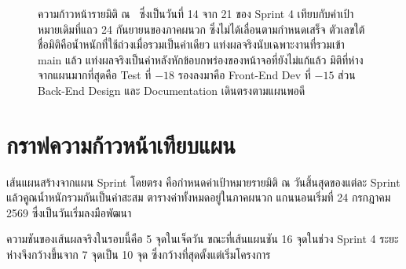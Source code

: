 \begin{figure}[H]
\centering
{}
\vspace{0.6em}
\caption{ความก้าวหน้ารายมิติ ณ \reportdate\ ซึ่งเป็นวันที่ 14 จาก 21 ของ Sprint 4
 เทียบกับค่าเป้าหมายเดิมที่แถว 24 กันยายนของภาคผนวก ซึ่งไม่ได้เลื่อนตามกำหนดเสร็จ
 ตัวเลขใต้ชื่อมิติคือน้ำหนักที่ใช้ถ่วงเมื่อรวมเป็นค่าเดียว
 แท่งผลจริงนับเฉพาะงานที่รวมเข้า main แล้ว
 แท่งผลจริงเป็นค่าหลังหักข้อบกพร่องของหน้าจอที่ยังไม่แก้แล้ว
 มิติที่ห่างจากแผนมากที่สุดคือ Test ที่ $-18$ รองลงมาคือ Front-End Dev ที่ $-15$
 ส่วน Back-End Design และ Documentation เดินตรงตามแผนพอดี}
\label{fig:dims}
\end{figure}

\clearpage
\section{กราฟความก้าวหน้าเทียบแผน}

เส้นแผนสร้างจากแผน Sprint โดยตรง คือกำหนดค่าเป้าหมายรายมิติ ณ วันสิ้นสุดของแต่ละ Sprint แล้วคูณน้ำหนักรวมกันเป็นค่าสะสม ตารางค่าทั้งหมดอยู่ในภาคผนวก แกนนอนเริ่มที่ 24 กรกฎาคม 2569 ซึ่งเป็นวันเริ่มลงมือพัฒนา

ความชันของเส้นผลจริงในรอบนี้คือ 5 จุดในเจ็ดวัน ขณะที่เส้นแผนชัน 16 จุดในช่วง Sprint 4 ระยะห่างจึงกว้างขึ้นจาก 7 จุดเป็น 10 จุด ซึ่งกว้างที่สุดตั้งแต่เริ่มโครงการ

